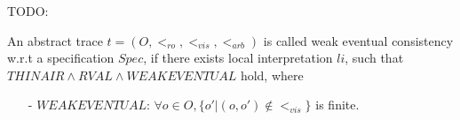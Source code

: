 {\color {blue}TODO:

\begin{definition}
\label{definition:eventual consistency}
An abstract trace $t = (O,<_{\textit{ro}},<_{\textit{vis}},<_{\textit{arb}})$ is called weak eventual consistency w.r.t a specification $Spec$, if there exists local interpretation $li$, such that $\textit{THINAIR} \wedge \textit{RVAL} \wedge \textit{WEAKEVENTUAL}$ hold, where

\begin{itemize}
\setlength{\itemsep}{0.5pt}
\item[-] $\textit{WEAKEVENTUAL}$: $\forall o \in O, \{ o' \vert (o,o') \notin <_{\textit{vis}} \}$ is finite.
\end{itemize}
\end{definition}

}















